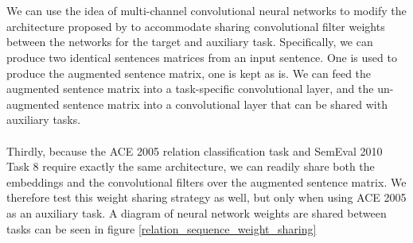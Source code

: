 \\\\
We can use the idea of multi-channel convolutional neural networks to modify the architecture proposed by \citet{nguyen2015} to accommodate sharing convolutional filter weights between the networks for the target and auxiliary task. Specifically, we can produce two identical sentences matrices from an input sentence. One is used to produce the augmented sentence matrix, one is kept as is. We can feed the augmented sentence matrix into a task-specific convolutional layer, and the un-augmented sentence matrix into a convolutional layer that can be shared with auxiliary tasks.
\\\\
Thirdly, because the ACE 2005 relation classification task and SemEval 2010 Task 8 require exactly the same architecture, we can readily share both the embeddings and the convolutional filters over the augmented sentence matrix. We therefore test this weight sharing strategy as well, but only when using ACE 2005 as an auxiliary task. A diagram of neural network weights are shared between tasks can be seen in figure \ref{relation_sequence_weight_sharing}
\newpage
